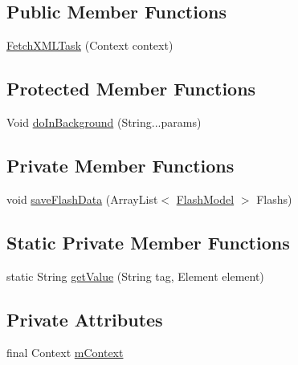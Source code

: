 \subsection*{Public Member Functions}
\begin{DoxyCompactItemize}
\item 
\hyperlink{classorg_1_1buildmlearn_1_1learnwithflashcards_1_1data_1_1FetchXMLTask_a1e79a7155f9b8383e0bd55345764584e}{Fetch\+X\+M\+L\+Task} (Context context)
\end{DoxyCompactItemize}
\subsection*{Protected Member Functions}
\begin{DoxyCompactItemize}
\item 
Void \hyperlink{classorg_1_1buildmlearn_1_1learnwithflashcards_1_1data_1_1FetchXMLTask_adafe45b665cebad0e76f479a3d1b8cdb}{do\+In\+Background} (String...\+params)
\end{DoxyCompactItemize}
\subsection*{Private Member Functions}
\begin{DoxyCompactItemize}
\item 
void \hyperlink{classorg_1_1buildmlearn_1_1learnwithflashcards_1_1data_1_1FetchXMLTask_a7e184c603deca46f6833b51380fd0430}{save\+Flash\+Data} (Array\+List$<$ \hyperlink{classorg_1_1buildmlearn_1_1learnwithflashcards_1_1data_1_1FlashModel}{Flash\+Model} $>$ Flashs)
\end{DoxyCompactItemize}
\subsection*{Static Private Member Functions}
\begin{DoxyCompactItemize}
\item 
static String \hyperlink{classorg_1_1buildmlearn_1_1learnwithflashcards_1_1data_1_1FetchXMLTask_a703e08b04b1adb90e34f79b39b454e32}{get\+Value} (String tag, Element element)
\end{DoxyCompactItemize}
\subsection*{Private Attributes}
\begin{DoxyCompactItemize}
\item 
final Context \hyperlink{classorg_1_1buildmlearn_1_1learnwithflashcards_1_1data_1_1FetchXMLTask_a79d9693062989444484f12300f71309c}{m\+Context}
\end{DoxyCompactItemize}


